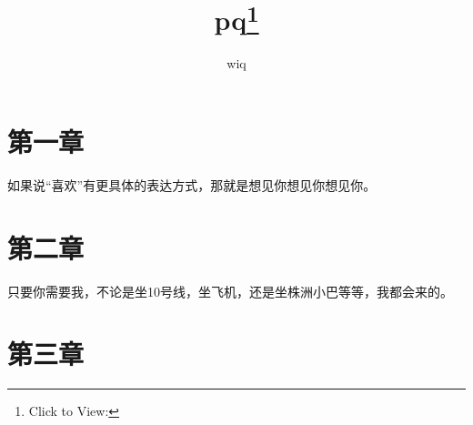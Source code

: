 \documentclass{article}
\title{pq\footnote{Click to View:\url{}}}
\author{wiq}
\date{}
\begin{document}

\Large



{\centering\section*{第一章}}



如果说“喜欢”有更具体的表达方式，那就是想见你想见你想见你。



{\centering\section*{第二章}}



只要你需要我，不论是坐10号线，坐飞机，还是坐株洲小巴等等，我都会来的。



{\centering\section*{第三章}}
\end{document}
